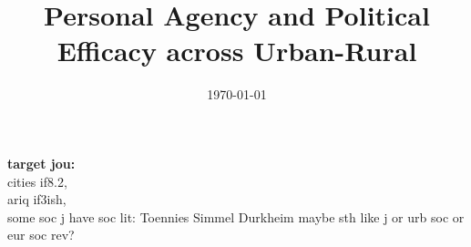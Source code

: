 \documentclass[10pt, letterpaper]{article}
\date{{}\today \hspace{.2in}\xxivtime}
\title{  %
  Personal Agency and Political Efficacy across Urban-Rural 
}
\author{
}
\begin{document}


\maketitle
\vspace{-.4in}
\begin{center}

\end{center}

\noindent\textbf{target jou:}\\
  cities if8.2,\\
  ariq if3ish,\\
  some soc j have soc lit: Toennies Simmel Durkheim maybe sth like j or urb soc or eur soc rev?\\
\end{document}
